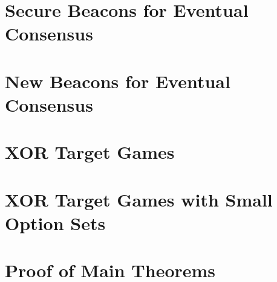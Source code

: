 



\chapter{Secure Beacons for Eventual Consensus}\label{sec:xorgames-intro}


\chapter{New Beacons for Eventual Consensus}
\label{sec:xorgames-model}

\chapter{XOR Target Games}\label{sec:xor-games}


\chapter{XOR Target Games with Small Option Sets}\label{sec:poisson-bernoulli}



\chapter{Proof of Main Theorems}\label{sec:main-thm-proofs}




